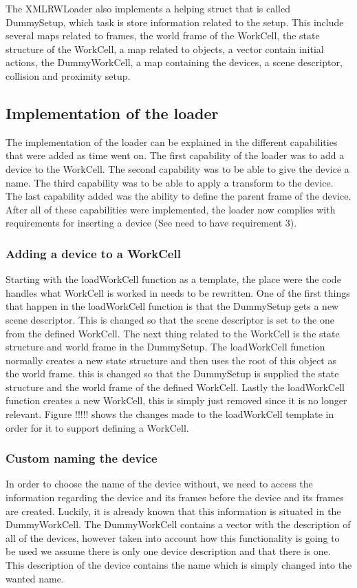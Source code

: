 The XMLRWLoader also implements a helping struct that is called DummySetup, which task is store information related to the setup. This include several maps related to frames, the world frame of the WorkCell, the state structure of the WorkCell, a map related to objects, a vector contain initial actions, the DummyWorkCell, a map containing the devices, a scene descriptor, collision and proximity setup.

\subsection{Implementation of the loader}
The implementation of the loader can be explained in the different capabilities that were added as time went on. The first capability of the loader was to add a device to the WorkCell. The second capability was to be able to give the device a name. The third capability was to be able to apply a transform to the device. The last capability added was the ability to define the parent frame of the device. After all of these capabilities were implemented, the loader now complies with requirements for inserting a device (See need to have requirement 3).

\subsubsection{Adding a device to a WorkCell}
Starting with the loadWorkCell function as a template, the place were the code handles what WorkCell is worked in needs to be rewritten. One of the first things that happen in the loadWorkCell function is that the DummySetup gets a new scene descriptor. This is changed so that the scene descriptor is set to the one from the defined WorkCell. The next thing related to the WorkCell is the state structure and world frame in the DummySetup. The loadWorkCell function normally creates a new state structure and then uses the root of this object as the world frame. this is changed so that the DummySetup is supplied the state structure and the world frame of the defined WorkCell. Lastly the loadWorkCell function creates a new WorkCell, this is simply just removed since it is no longer relevant. Figure !!!!! shows the changes made to the loadWorkCell template in order for it to support defining a WorkCell.

\subsubsection{Custom naming the device}
In order to choose the name of the device without, we need to access the information regarding the device and its frames before the device and its frames are created. Luckily, it is already known that this information is situated in the DummyWorkCell. The DummyWorkCell contains a vector with the description of all of the devices, however taken into account how this functionality is going to be used we assume there is only one device description and that there is one. This description of the device contains the name which is simply changed into the wanted name.\\

